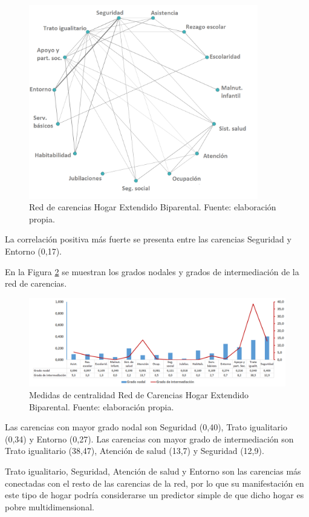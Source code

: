 \documentclass[12pt,letterpaper,spanish]{article}
\begin{document}
\begin{figure}[H]
  \centering
    \includegraphics[width=10cm]{Grafos/grafo_biex_pos.png}
    \caption{Red de carencias Hogar Extendido Biparental. Fuente: elaboración propia.}
    \label{RedBiexpos}
\end{figure}

La correlación positiva más fuerte se presenta entre las carencias Seguridad y Entorno (0,17). 

En la Figura \ref{CenBiex} se muestran los grados nodales y grados de intermediación de la red de carencias.

\begin{figure}[H]
    \centering
    \includegraphics[width=\textwidth]{Grafos/nc_biex.png}
    \caption{Medidas de centralidad Red de Carencias Hogar Extendido Biparental. Fuente: elaboración propia.}
    \label{CenBiex}
\end{figure}
Las carencias con mayor grado nodal son Seguridad (0,40), Trato igualitario (0,34) y Entorno (0,27). Las carencias con mayor grado de intermediación son Trato igualitario (38,47), Atención de salud (13,7) y Seguridad (12,9).

Trato igualitario, Seguridad, Atención de salud y Entorno son las carencias más conectadas con el resto de las carencias de la red, por lo que su manifestación en este tipo de hogar podría considerarse un predictor simple de que dicho hogar es pobre multidimensional. 
\end{document}
